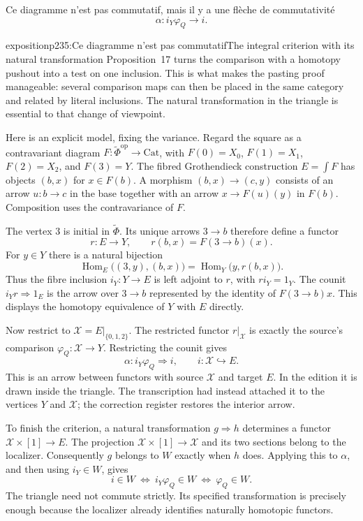
Ce diagramme n'est pas commutatif, mais il y a une flèche de commutativité
\[
\alpha : i_Y\varphi_Q \longrightarrow i.
\]

\begin{dcomment}{exposition}{p235:Ce diagramme n'est pas commutatif}{The integral criterion with its natural transformation}
Proposition~17 turns the comparison with a homotopy pushout into a test on one inclusion. This is what makes the pasting proof manageable: several comparison maps can then be placed in the same category and related by literal inclusions. The natural transformation in the triangle is essential to that change of viewpoint.

Here is an explicit model, fixing the variance. Regard the square as a contravariant diagram $F:\widetilde\Phi^{\mathrm{op}}\to\mathrm{Cat}$, with $F(0)=X_0$, $F(1)=X_1$, $F(2)=X_2$, and $F(3)=Y$. The fibred Grothendieck construction $E=\int F$ has objects $(b,x)$ for $x\in F(b)$. A morphism $(b,x)\to(c,y)$ consists of an arrow $u:b\to c$ in the base together with an arrow $x\to F(u)(y)$ in $F(b)$. Composition uses the contravariance of $F$.

The vertex $3$ is initial in $\widetilde\Phi$. Its unique arrows $3\to b$ therefore define a functor
\[
 r:E\longrightarrow Y,
 \qquad r(b,x)=F(3\to b)(x).
\]
For $y\in Y$ there is a natural bijection
\[
 \operatorname{Hom}_E\bigl((3,y),(b,x)\bigr)
   =\operatorname{Hom}_Y\bigl(y,r(b,x)\bigr).
\]
Thus the fibre inclusion $i_Y:Y\to E$ is left adjoint to $r$, with $ri_Y=1_Y$. The counit $i_Yr\Rightarrow1_E$ is the arrow over $3\to b$ represented by the identity of $F(3\to b)x$. This displays the homotopy equivalence of $Y$ with $E$ directly.

Now restrict to $\mathcal X=E|_{\{0,1,2\}}$. The restricted functor $r|_{\mathcal X}$ is exactly the source's comparison $\varphi_Q:\mathcal X\to Y$. Restricting the counit gives
\[
 \alpha:i_Y\varphi_Q\Longrightarrow i,
 \qquad i:\mathcal X\hookrightarrow E.
\]
This is an arrow between functors with source $\mathcal X$ and target $E$. In the edition it is drawn inside the triangle. The transcription had instead attached it to the vertices $Y$ and $\mathcal X$; the correction register restores the interior arrow.

To finish the criterion, a natural transformation $g\Rightarrow h$ determines a functor $\mathcal X\times[1]\to E$. The projection $\mathcal X\times[1]\to\mathcal X$ and its two sections belong to the localizer. Consequently $g$ belongs to $W$ exactly when $h$ does. Applying this to $\alpha$, and then using $i_Y\in W$, gives
\[
 i\in W
 \ \Longleftrightarrow\ i_Y\varphi_Q\in W
 \ \Longleftrightarrow\ \varphi_Q\in W.
\]
The triangle need not commute strictly. Its specified transformation is precisely enough because the localizer already identifies naturally homotopic functors.
\end{dcomment}


